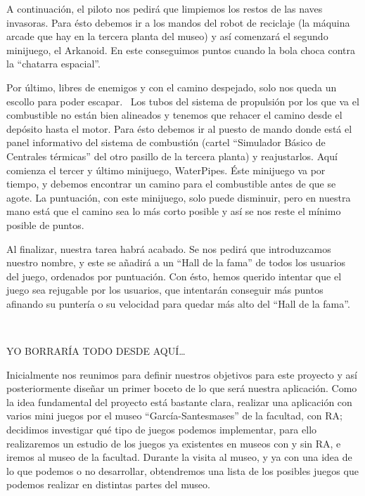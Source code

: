 \documentclass[]{article}
\begin{document}
A continuación, el piloto nos pedirá que limpiemos los restos de las
naves invasoras. Para ésto debemos ir a los mandos del robot de
reciclaje (la máquina arcade que hay en la tercera planta del museo) y
así comenzará el segundo minijuego, el Arkanoid. En este conseguimos
puntos cuando la bola choca contra la ``chatarra espacial''.

Por último, libres de enemigos y con el camino despejado, solo nos queda
un escollo para poder escapar. ~Los tubos del sistema de propulsión por
los que va el combustible no están bien alineados y tenemos que rehacer
el camino desde el depósito hasta el motor. Para ésto debemos ir al
puesto de mando donde está el panel informativo del sistema de
combustión (cartel ``Simulador Básico de Centrales térmicas'' del otro
pasillo de la tercera planta) y reajustarlos. Aquí comienza el tercer y
último minijuego, WaterPipes. Éste minijuego va por tiempo, y debemos
encontrar un camino para el combustible antes de que se agote. La
puntuación, con este minijuego, solo puede disminuir, pero en nuestra
mano está que el camino sea lo más corto posible y así se nos reste el
mínimo posible de puntos.

Al finalizar, nuestra tarea habrá acabado. Se nos pedirá que
introduzcamos nuestro nombre, y este se añadirá a un ``Hall de la fama''
de todos los usuarios del juego, ordenados por puntuación. Con ésto,
hemos querido intentar que el juego sea rejugable por los usuarios, que
intentarán conseguir más puntos afinando su puntería o su velocidad para
quedar más alto del ``Hall de la fama''.

~~~~~~~~

YO BORRARÍA TODO DESDE AQUÍ\ldots{}

Inicialmente nos reunimos para definir nuestros objetivos para este
proyecto y así posteriormente diseñar un primer boceto de lo que será
nuestra aplicación. Como la idea fundamental del proyecto está bastante
clara, realizar una aplicación con varios mini juegos por el museo
``García-Santesmases'' de la facultad, con RA; decidimos investigar qué
tipo de juegos podemos implementar, para ello realizaremos un estudio de
los juegos ya existentes en museos con y sin RA, e iremos al museo de la
facultad. Durante la visita al museo, y ya con una idea de lo que
podemos o no desarrollar, obtendremos una lista de los posibles juegos
que podemos realizar en distintas partes del museo.
\end{document}
